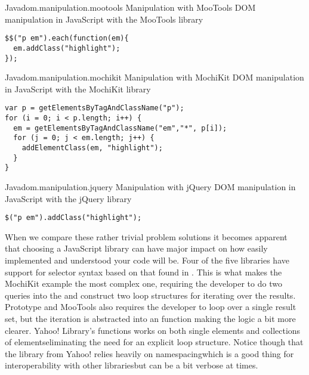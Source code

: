 \begin{scode}{Java}{dom.manipulation.mootools}{%
   Manipulation with MooTools}{%
  DOM manipulation in JavaScript with the MooTools library}
\begin{lstlisting}
$$("p em").each(function(em){
  em.addClass("highlight");
});
\end{lstlisting}
\end{scode}

\begin{scode}{Java}{dom.manipulation.mochikit}{%
   Manipulation with MochiKit}{%
  DOM manipulation in JavaScript with the MochiKit library}
\begin{lstlisting}
var p = getElementsByTagAndClassName("p");
for (i = 0; i < p.length; i++) {
  em = getElementsByTagAndClassName("em","*", p[i]);
  for (j = 0; j < em.length; j++) {
    addElementClass(em, "highlight");
  }
}
\end{lstlisting}
\end{scode}

\begin{scode}{Java}{dom.manipulation.jquery}{%
   Manipulation with jQuery}{%
  DOM manipulation in JavaScript with the jQuery library}
\begin{lstlisting}
$("p em").addClass("highlight");
\end{lstlisting}
\end{scode}

When we compare these rather trivial problem solutions it becomes apparent
that choosing a JavaScript library can have major impact on how easily
implemented and understood your code will be. Four of the five libraries
have support for selector syntax based on
that found in%
.
This is what makes the MochiKit example the most complex one, requiring the
developer to do two queries into the  and construct two
loop structures for iterating over the results.
Prototype and MooTools also requires the developer to loop over a single
result set, but the iteration is abstracted into an  function
making the logic a bit more clearer. Yahoo!  Library's 
functions works on both single elements and collections of
elements\dash{}eliminating the need for an explicit loop structure.
Notice though that the library from
Yahoo! relies heavily on namespacing\dash{}which is a good thing for
interoperability with other libraries\dash{}but can be a bit verbose at times.

